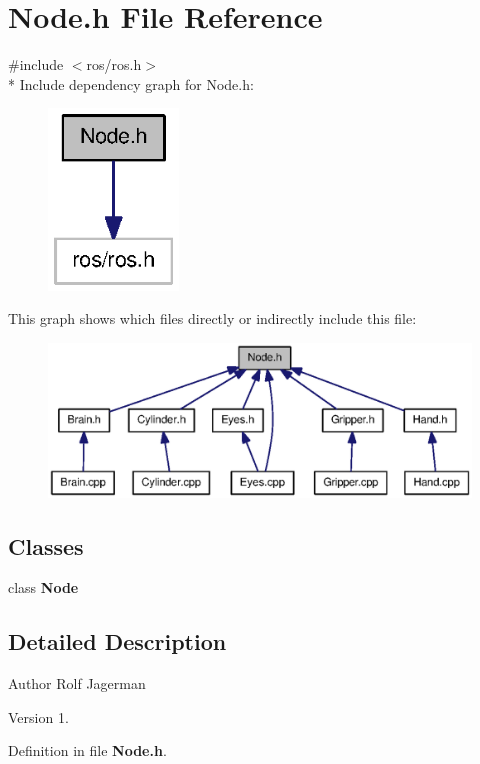 \section{Node.\-h File Reference}
\label{Node_8h}
{\ttfamily \#include $<$ros/ros.\-h$>$}\\*
Include dependency graph for Node.\-h\-:
\nopagebreak
\begin{figure}[H]
\begin{center}
\leavevmode
\includegraphics[width=98pt]{Node_8h__incl}
\end{center}
\end{figure}
This graph shows which files directly or indirectly include this file\-:
\nopagebreak
\begin{figure}[H]
\begin{center}
\leavevmode
\includegraphics[width=350pt]{Node_8h__dep__incl}
\end{center}
\end{figure}
\subsection*{Classes}
\begin{DoxyCompactItemize}
\item 
class {\bf Node}
\end{DoxyCompactItemize}


\subsection{Detailed Description}
\begin{DoxyAuthor}{Author}
Rolf Jagerman 
\end{DoxyAuthor}
\begin{DoxyVersion}{Version}
1. 
\end{DoxyVersion}


Definition in file {\bf Node.\-h}.

